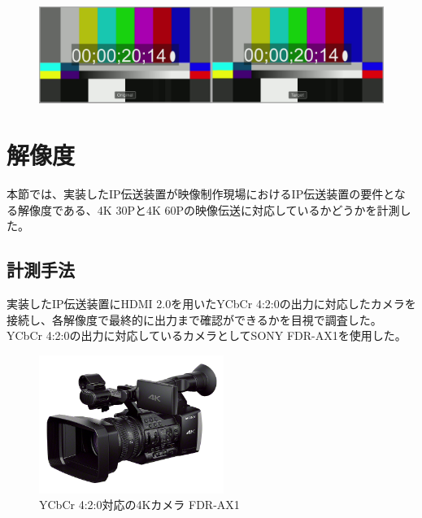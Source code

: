 \begin{figure}[htbp]
  \begin{center}
    \includegraphics[bb=0 0 1920 540,width=14cm]{img/evaluate-delay-hardware.png}
  \end{center}
  \caption[ハードウェア実装による遅延計測のキャプチャー画像]{}
  \label{fig:evaluate-delay-hardware}
\end{figure}

\newpage
\section{解像度}
本節では、実装したIP伝送装置が映像制作現場におけるIP伝送装置の要件となる解像度である、4K 30Pと4K 60Pの映像伝送に対応しているかどうかを計測した。

\subsection{計測手法}
実装したIP伝送装置にHDMI 2.0を用いたYCbCr 4:2:0の出力に対応したカメラを接続し、各解像度で最終的に出力まで確認ができるかを目視で調査した。
YCbCr 4:2:0の出力に対応しているカメラとしてSONY FDR-AX1を使用した。

\begin{figure}[htbp]
  \begin{center}
    \includegraphics[bb=0 0 740 555,width=6cm]{img/FDR-AX1.jpg}
  \end{center}
  \caption{YCbCr 4:2:0対応の4Kカメラ FDR-AX1}
  \label{fig:fdr-ax1}
\end{figure}

